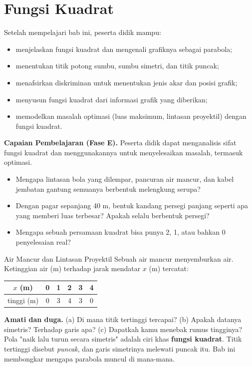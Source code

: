 \documentclass[11pt,a4paper]{report}
\theoremstyle{gaya}
\begin{document}
\chapter{Fungsi Kuadrat}
\begin{tujuan}
Setelah mempelajari bab ini, peserta didik mampu:
\begin{itemize}[leftmargin=*,topsep=2pt]
  \item menjelaskan fungsi kuadrat dan mengenali grafiknya sebagai parabola;
  \item menentukan titik potong sumbu, sumbu simetri, dan titik puncak;
  \item menafsirkan diskriminan untuk menentukan jenis akar dan posisi grafik;
  \item menyusun fungsi kuadrat dari informasi grafik yang diberikan;
  \item memodelkan masalah optimasi (luas maksimum, lintasan proyektil) dengan fungsi kuadrat.
\end{itemize}
\textbf{Capaian Pembelajaran (Fase E).} Peserta didik dapat menganalisis sifat fungsi kuadrat dan menggunakannya untuk menyelesaikan masalah, termasuk optimasi.
\end{tujuan}

\begin{pemantik}
\begin{itemize}[leftmargin=*,topsep=2pt]
  \item Mengapa lintasan bola yang dilempar, pancuran air mancur, dan kabel jembatan gantung semuanya berbentuk melengkung serupa?
  \item Dengan pagar sepanjang 40 m, bentuk kandang persegi panjang seperti apa yang memberi luas terbesar? Apakah selalu berbentuk persegi?
  \item Mengapa sebuah persamaan kuadrat bisa punya 2, 1, atau bahkan 0 penyelesaian real?
\end{itemize}
\end{pemantik}

\begin{studikasus}{Air Mancur dan Lintasan Proyektil}
Sebuah air mancur menyemburkan air. Ketinggian air (m) terhadap jarak mendatar $x$ (m) tercatat:
\begin{center}
\begin{tabular}{c|ccccc}
\toprule
$x$ (m) & 0 & 1 & 2 & 3 & 4 \\
\midrule
tinggi (m) & 0 & 3 & 4 & 3 & 0 \\
\bottomrule
\end{tabular}
\end{center}
\textbf{Amati dan duga.} (a) Di mana titik tertinggi tercapai? (b) Apakah datanya simetris? Terhadap garis apa? (c) Dapatkah kamu menebak rumus tingginya? Pola "naik lalu turun secara simetris" adalah ciri khas \textbf{fungsi kuadrat}. Titik tertinggi disebut \emph{puncak}, dan garis simetrinya melewati puncak itu. Bab ini membongkar mengapa parabola muncul di mana-mana.
\end{studikasus}
\end{document}
